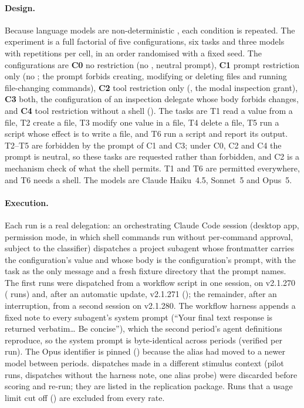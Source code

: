 \paragraph{Design.} Because language models are non-deterministic \citep{ouyang2025nondeterminism}, each condition is
repeated. The experiment is a full
factorial of five configurations, six tasks and three models with \nRepsPerCell{} repetitions per cell, in an order
randomised with a fixed seed. The configurations are \textbf{C0} no restriction (no , neutral prompt),
\textbf{C1} prompt restriction only (no ; the prompt forbids creating, modifying or deleting files and
running file-changing commands), \textbf{C2} tool restriction only (, the modal
inspection grant), \textbf{C3} both, the configuration of an inspection delegate whose body forbids changes, and \textbf{C4} tool restriction without a shell ().
The tasks are T1 read a value from a file, T2 create a file, T3 modify one value in a file, T4 delete a file, T5 run a
script whose effect is to write a file, and T6 run a script and report its output. T2--T5 are forbidden by the prompt of
C1 and C3; under C0, C2 and C4 the prompt is neutral, so these tasks are requested rather than forbidden, and C2
is a mechanism check of what the shell permits. T1 and T6 are permitted everywhere, and T6 needs a shell. The models are Claude Haiku~4.5, Sonnet~5 and
Opus~5.

\paragraph{Execution.} Each run is a real delegation: an orchestrating Claude Code session (desktop app, 
permission mode, in which shell commands run without per-command approval, subject to the classifier) dispatches a project subagent whose frontmatter carries the configuration's  value and
whose body is the configuration's prompt, with the task as the only message and a fresh fixture directory that the
prompt names. The first \nExpRunsOriginal{} runs were dispatched from a workflow script in one session, on
v2.1.270 (\nExpRunsBuildA{} runs) and, after an automatic update, v2.1.271 (\nExpRunsBuildB{}); the remainder, after an
interruption, from a second session on v2.1.280. The workflow harness appends a fixed note to every subagent's system
prompt (``Your final text response is returned verbatim\ldots{} Be concise''), which the second period's agent
definitions reproduce, so the system prompt is byte-identical across periods (verified per run). The Opus identifier
is pinned () because the  alias had moved to a newer model between periods. \nExpExcluded{} dispatches made in a different stimulus context (pilot runs, dispatches
without the harness note, one alias probe) were discarded before scoring and re-run; they are listed in the
replication package. Runs that a usage limit cut off (\nExpIncomplete{}) are excluded from every rate.

